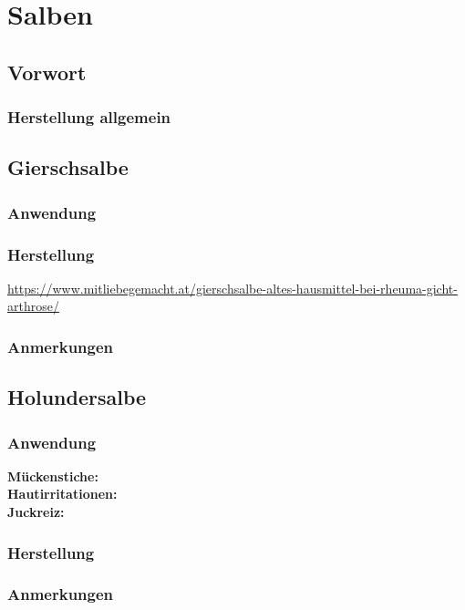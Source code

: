 \chapter{Salben}

\section{Vorwort}

\lipsum[1-5]
\newpage



\subsection{Herstellung allgemein}



\section{Gierschsalbe}

\subsection{Anwendung}

\subsection{Herstellung}

\url{https://www.mitliebegemacht.at/gierschsalbe-altes-hausmittel-bei-rheuma-gicht-arthrose/}

\subsection{Anmerkungen}





\section{Holundersalbe}

\subsection{Anwendung}

\textbf{Mückenstiche:} \\ 

\textbf{Hautirritationen:} \\ 

\textbf{Juckreiz:} \\ 

\subsection{Herstellung}

\subsection{Anmerkungen}